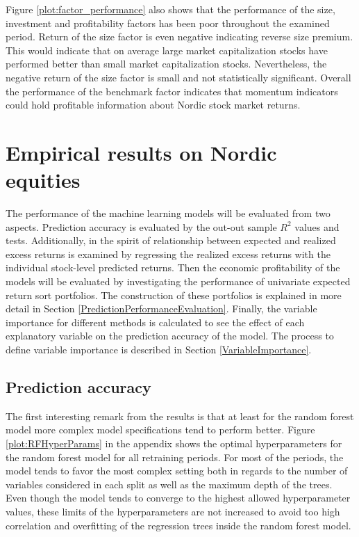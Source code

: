 \documentclass[12pt]{article}
\begin{document}
Figure \ref{plot:factor_performance} also shows that the performance of the size, investment and profitability factors has been poor throughout the examined period. Return of the size factor is even negative indicating reverse size premium. This would indicate that on average large market capitalization stocks have performed better than small market capitalization stocks. Nevertheless, the negative return of the size factor is small and not statistically significant. Overall the performance of the benchmark factor indicates that momentum indicators could hold profitable information about Nordic stock market returns. \par

\section{Empirical results on Nordic equities}

The performance of the machine learning models will be evaluated from two aspects. Prediction accuracy is evaluated by the out-out sample $R^2$ values and \citet{Diebold1995} tests. Additionally, in the spirit of \citet{Lewellen2015} relationship between expected and realized excess returns is examined by regressing the realized excess returns with the individual stock-level predicted returns.\footnotemark {} Then the economic profitability of the models will be evaluated by investigating the performance of univariate expected return sort portfolios. The construction of these portfolios is explained in more detail in Section \ref{PredictionPerformanceEvaluation}. Finally, the variable importance for different methods is calculated to see the effect of each explanatory variable on the prediction accuracy of the model. The process to define variable importance is described in Section \ref{VariableImportance}. \par

\subsection{Prediction accuracy}\label{PredictionAccuracy}

The first interesting remark from the results is that at least for the random forest model more complex model specifications tend to perform better. Figure \ref{plot:RFHyperParams} in the appendix shows the optimal hyperparameters for the random forest model for all retraining periods. For most of the periods, the model tends to favor the most complex setting both in regards to the number of variables considered in each split as well as the maximum depth of the trees. Even though the model tends to converge to the highest allowed hyperparameter values, these limits of the hyperparameters are not increased to avoid too high correlation and overfitting of the regression trees inside the random forest model. \par
\end{document}
